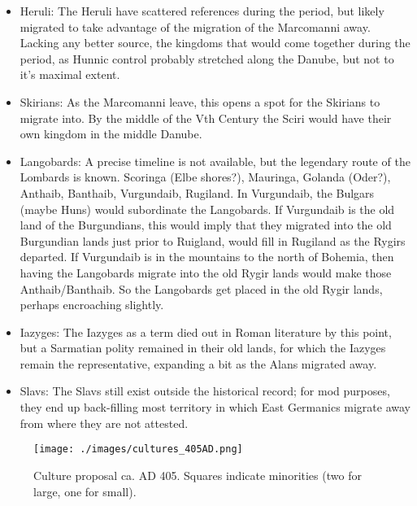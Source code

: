 \documentclass{article}
\begin{document}
\begin{itemize}
		\item Heruli:\newline
		The Heruli have scattered references during the period, but likely migrated to take advantage of the migration of the Marcomanni away.
		Lacking any better source, the kingdoms that would come together during the period, as Hunnic control probably stretched along the Danube, but not to it's maximal extent.
		
		\item Skirians:\newline
		As the Marcomanni leave, this opens a spot for the Skirians to migrate into.
		By the middle of the Vth Century the Sciri would have their own kingdom in the middle Danube.
		
		\item Langobards:\newline
		A precise timeline is not available, but the legendary route of the Lombards is known.
		Scoringa (Elbe shores?), Mauringa, Golanda (Oder?), Anthaib, Banthaib, Vurgundaib, Rugiland.
		In Vurgundaib, the Bulgars (maybe Huns) would subordinate the Langobards.
		If Vurgundaib is the old land of the Burgundians, this would imply that they migrated into the old Burgundian lands just prior to Ruigland, would fill in Rugiland as the Rygirs departed.
		If Vurgundaib is in the mountains to the north of Bohemia, then having the Langobards migrate into the old Rygir lands would make those Anthaib/Banthaib.
		So the Langobards get placed in the old Rygir lands, perhaps encroaching slightly.
		
		\item Iazyges:\newline
		The Iazyges as a term died out in Roman literature by this point, but a Sarmatian polity remained in their old lands, for which the Iazyges remain the representative, expanding a bit as the Alans migrated away.
		
		\item Slavs:\newline
		The Slavs still exist outside the historical record; for mod purposes, they end up back-filling most territory in which East Germanics migrate away from where they are not attested.
	\end{itemize}
	
	\newpage
	\begin{figure}[h!]
		\centering
		\texttt{[image: ./images/cultures\_405AD.png]}
		\caption{Culture proposal ca. AD 405. Squares indicate minorities (two for large, one for small).}
	\end{figure}
	
\end{document}
